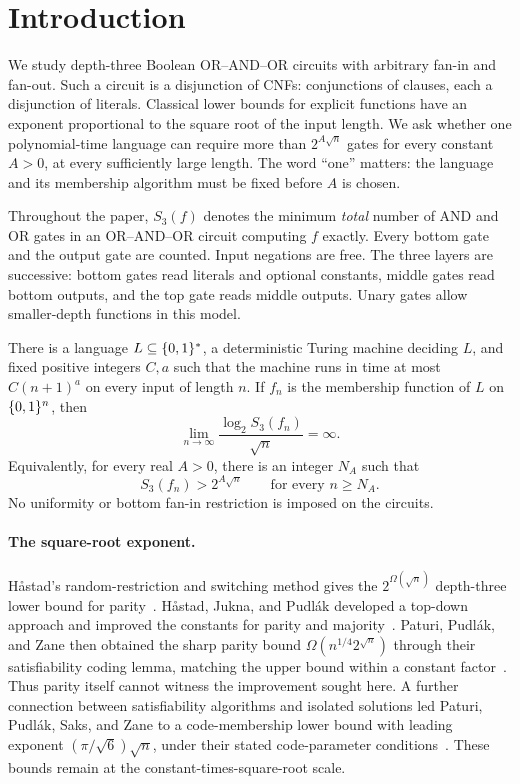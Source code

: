 \section{Introduction}\label{sec:introduction}

We study depth-three Boolean OR--AND--OR circuits with arbitrary
fan-in and fan-out.  Such a circuit is a disjunction of CNFs:
conjunctions of clauses, each a disjunction of literals.
Classical lower bounds for explicit functions have an exponent
proportional to the square root of the input length.  We ask whether
one polynomial-time language can require more than \(2^{A\sqrt n}\)
gates for every constant \(A>0\), at every sufficiently large length.
The word ``one'' matters: the language and its membership algorithm
must be fixed before \(A\) is chosen.

Throughout the paper, \(S_3(f)\) denotes the minimum \emph{total}
number of AND and OR gates in an OR--AND--OR circuit computing \(f\)
exactly.  Every bottom gate and the output gate are counted.  Input
negations are free.  The three layers are successive: bottom gates
read literals and optional constants, middle gates read bottom outputs,
and the top gate reads middle outputs.  Unary gates allow smaller-depth
functions in this model.

\begin{theorem}\label{thm:main}
There is a language \(L\subseteq\{0,1\}^*\), a deterministic Turing machine
deciding \(L\), and fixed positive integers \(C,a\) such that the machine
runs in time at most \(C(n+1)^a\) on every input of length \(n\).
If \(f_n\) is the membership function of \(L\) on \(\{0,1\}^n\), then
\[
 \lim_{n\to\infty}\frac{\log_2 S_3(f_n)}{\sqrt n}=\infty.
\]
Equivalently, for every real \(A>0\), there is an integer \(N_A\)
such that
\[
 S_3(f_n)>2^{A\sqrt n}\qquad\text{for every }n\ge N_A.
\]
No uniformity or bottom fan-in restriction is imposed on the circuits.
\end{theorem}

\paragraph{The square-root exponent.}
H\aa stad's random-restriction and switching method gives the
\(2^{\Omega(\sqrt n)}\) depth-three lower bound for
parity~\cite[Theorem~1]{H89}.  H\aa stad, Jukna, and Pudl\'ak developed
a top-down approach and improved the constants for parity and
majority~\cite[Theorems~3.3 and~3.5]{HJP95}.
Paturi, Pudl\'ak, and Zane then obtained the sharp parity bound
\(\Omega(n^{1/4}2^{\sqrt n})\) through their satisfiability coding
lemma, matching the upper bound within a constant
factor~\cite[Theorem~6]{PPZ99}.  Thus parity itself cannot witness
the improvement sought here.  A further connection between
satisfiability algorithms and isolated solutions led Paturi,
Pudl\'ak, Saks, and Zane to a code-membership lower bound with leading
exponent \((\pi/\sqrt6)\sqrt n\), under their stated code-parameter
conditions~\cite[Theorem~6]{PPSZ05}.  These bounds remain at the
constant-times-square-root scale.

